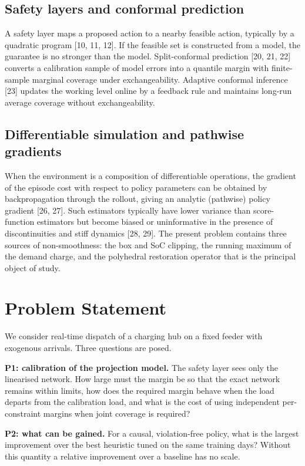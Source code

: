 \documentclass[11pt]{article}
\begin{document}
\subsection{Safety layers and conformal prediction}
A safety layer maps a proposed action to a nearby feasible action, typically by a quadratic program [10, 11, 12]. If the feasible set is constructed from a model, the guarantee is no stronger than the model. Split-conformal prediction [20, 21, 22] converts a calibration sample of model errors into a quantile margin with finite-sample marginal coverage under exchangeability. Adaptive conformal inference [23] updates the working level online by a feedback rule and maintains long-run average coverage without exchangeability.

\subsection{Differentiable simulation and pathwise gradients}
When the environment is a composition of differentiable operations, the gradient of the episode cost with respect to policy parameters can be obtained by backpropagation through the rollout, giving an analytic (pathwise) policy gradient [26, 27]. Such estimators typically have lower variance than score-function estimators but become biased or uninformative in the presence of discontinuities and stiff dynamics [28, 29]. The present problem contains three sources of non-smoothness: the box and SoC clipping, the running maximum of the demand charge, and the polyhedral restoration operator that is the principal object of study.

\section{Problem Statement}\label{sec:problem}
We consider real-time dispatch of a charging hub on a fixed feeder with exogenous arrivals. Three questions are posed.

\textbf{P1: calibration of the projection model.} The safety layer sees only the linearised network. How large must the margin be so that the exact network remains within limits, how does the required margin behave when the load departs from the calibration load, and what is the cost of using independent per-constraint margins when joint coverage is required?

\textbf{P2: what can be gained.} For a causal, violation-free policy, what is the largest improvement over the best heuristic tuned on the same training days? Without this quantity a relative improvement over a baseline has no scale.
\end{document}
